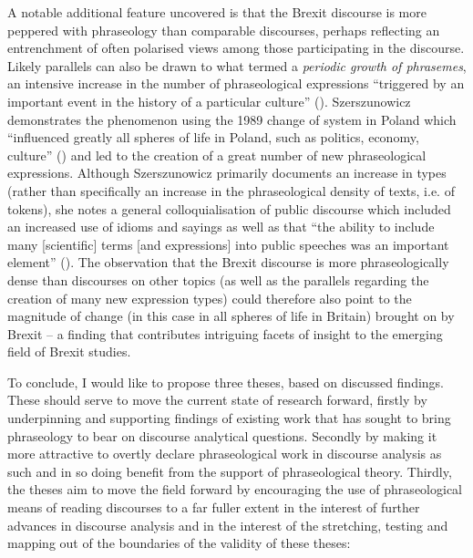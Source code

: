 \documentclass[output=paper]{langscibook}
\begin{document}
A notable additional feature uncovered is that the Brexit discourse is more peppered with phraseology than comparable discourses, perhaps reflecting an entrenchment of often polarised views among those participating in the discourse. Likely parallels can also be drawn to what \citet{Szerszunowicz2015} termed a \textit{periodic growth of phrasemes}, an intensive increase in the number of phraseological expressions ``triggered by an important event in the history of a particular culture'' (\citeyear[103]{Szerszunowicz2015}). Szerszunowicz demonstrates the phenomenon using the 1989 change of system in Poland which ``influenced greatly all spheres of life in Poland, such as politics, economy, culture'' (\citeyear[103]{Szerszunowicz2015}) and led to the creation of a great number of new phraseological expressions. Although Szerszunowicz primarily documents an increase in types (rather than specifically an increase in the phraseological density of texts, i.e. of tokens), she notes a general colloquialisation of public discourse which included an increased use of idioms and sayings as well as that ``the ability to include many [scientific] terms [and expressions] into public speeches was an important element'' (\citeyear[108]{Szerszunowicz2015}). The observation that the Brexit discourse is more phraseologically dense than discourses on other topics (as well as the parallels regarding the creation of many new expression types) could therefore also point to the magnitude of change (in this case in all spheres of life in Britain) brought on by Brexit -- a finding that contributes intriguing facets of insight to the emerging field of Brexit studies.

To conclude, I would like to propose three theses, based on discussed findings. These should serve to move the current state of research forward, firstly by underpinning and supporting findings of existing work that has sought to bring phraseology to bear on discourse analytical questions. Secondly by making it more attractive to overtly declare phraseological work in discourse analysis as such and in so doing benefit from the support of phraseological theory. Thirdly, the theses aim to move the field forward by encouraging the use of phraseological means of reading discourses to a far fuller extent in the interest of further advances in discourse analysis and in the interest of the stretching, testing and mapping out of the boundaries of the validity of these theses:
\end{document}
